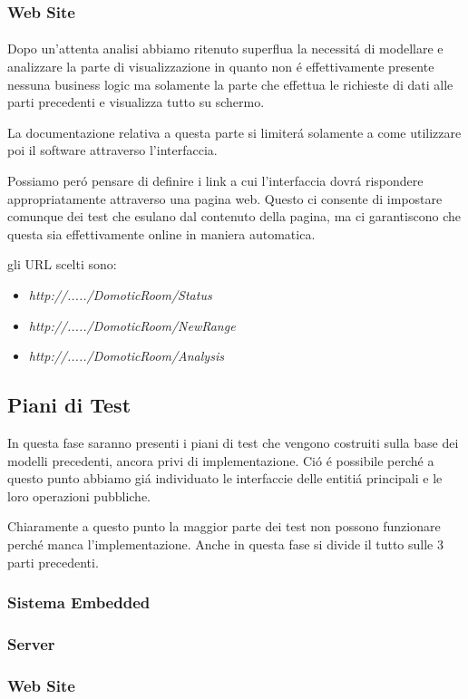 \subsubsection{Web Site}

\paragraph{}Dopo un'attenta analisi abbiamo ritenuto superflua la necessit\'a di modellare e analizzare la parte di visualizzazione in quanto non \'e effettivamente presente nessuna business logic ma solamente la parte che effettua le richieste di dati alle parti precedenti e visualizza tutto su schermo.

La documentazione relativa a questa parte si limiter\'a solamente a come utilizzare poi il software attraverso l'interfaccia.

Possiamo per\'o pensare di definire i link a cui l'interfaccia dovr\'a rispondere appropriatamente attraverso una pagina web. Questo ci consente di impostare comunque dei test che esulano dal contenuto della pagina, ma ci garantiscono che questa sia effettivamente online in maniera automatica.

gli URL scelti sono:
\begin{itemize}
  \item \textit{http://...../DomoticRoom/Status}
  \item \textit{http://...../DomoticRoom/NewRange}
  \item \textit{http://...../DomoticRoom/Analysis}
\end{itemize}

\subsection{Piani di Test}

In questa fase saranno presenti i piani di test che vengono costruiti sulla base dei modelli precedenti, ancora privi di implementazione. Ci\'o \'e possibile perch\'e a questo punto abbiamo gi\'a individuato le interfaccie delle entiti\'a principali e le loro operazioni pubbliche.

Chiaramente a questo punto la maggior parte dei test non possono funzionare perch\'e manca l'implementazione. Anche in questa fase si divide il tutto sulle 3 parti precedenti.

\subsubsection{Sistema Embedded}
\subsubsection{Server}
\subsubsection{Web Site}
